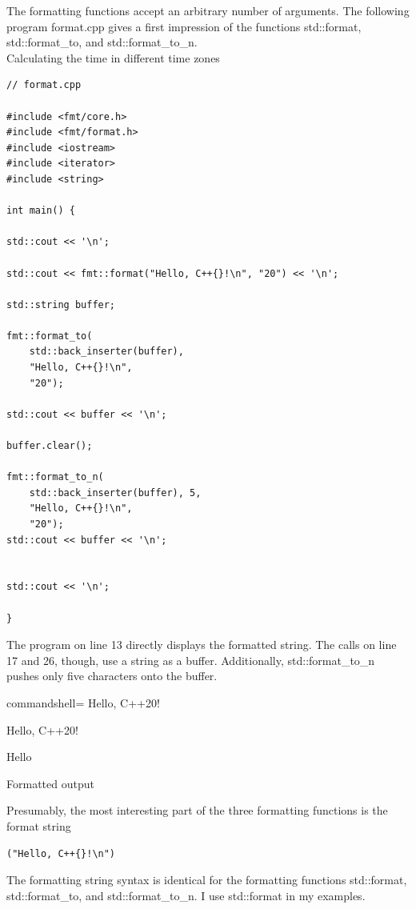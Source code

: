 The formatting functions accept an arbitrary number of arguments. The following program format.cpp gives a first impression of the functions std::format, std::format\_to, and std::format\_to\_n.
\
\hspace*{\fill} \\ %
\noindent
Calculating the time in different time zones
\begin{lstlisting}[style=styleCXX]
// format.cpp

#include <fmt/core.h>
#include <fmt/format.h>
#include <iostream>
#include <iterator>
#include <string>

int main() {

std::cout << '\n';

std::cout << fmt::format("Hello, C++{}!\n", "20") << '\n';

std::string buffer;

fmt::format_to(
	std::back_inserter(buffer),
	"Hello, C++{}!\n",
	"20");

std::cout << buffer << '\n';

buffer.clear();

fmt::format_to_n(
	std::back_inserter(buffer), 5,
	"Hello, C++{}!\n",
	"20");
std::cout << buffer << '\n';


std::cout << '\n';

}
\end{lstlisting}

The program on line 13 directly displays the formatted string. The calls on line 17 and 26, though, use a string as a buffer. Additionally, std::format\_to\_n pushes only five characters onto the buffer.

\begin{tcblisting}{commandshell={}}
Hello, C++20!

Hello, C++20!

Hello
\end{tcblisting}

\begin{center}
Formatted output
\end{center}

Presumably, the most interesting part of the three formatting functions is the format string \begin{lstlisting}[style=styleCXX]
("Hello, C++{}!\n")
\end{lstlisting}


The formatting string syntax is identical for the formatting functions std::format, std::format\_to, and std::format\_to\_n. I use std::format in my examples.

